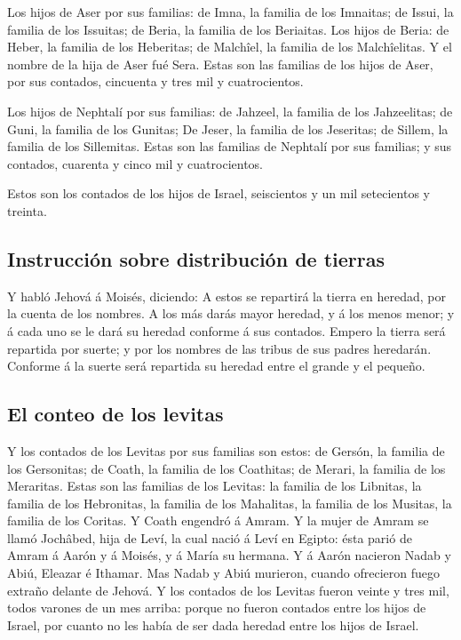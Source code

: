  Los hijos de Aser por sus familias: de Imna, la familia de
los Imnaitas; de Issui, la familia de los Issuitas; de Beria, la familia
de los Beriaitas.  Los hijos de Beria: de Heber, la familia
de los Heberitas; de Malchîel, la familia de los Malchîelitas.
 Y el nombre de la hija de Aser fué Sera. 
Estas son las familias de los hijos de Aser, por sus contados, cincuenta
y tres mil y cuatrocientos.

 Los hijos de Nephtalí por sus familias: de Jahzeel, la
familia de los Jahzeelitas; de Guni, la familia de los Gunitas;
 De Jeser, la familia de los Jeseritas; de Sillem, la
familia de los Sillemitas.  Estas son las familias de
Nephtalí por sus familias; y sus contados, cuarenta y cinco mil y
cuatrocientos.

 Estos son los contados de los hijos de Israel, seiscientos
y un mil setecientos y treinta.

\hypertarget{instrucciuxf3n-sobre-distribuciuxf3n-de-tierras}{%
\subsection{Instrucción sobre distribución de
tierras}\label{instrucciuxf3n-sobre-distribuciuxf3n-de-tierras}}

 Y habló Jehová á Moisés, diciendo:  A estos
se repartirá la tierra en heredad, por la cuenta de los nombres.
 A los más darás mayor heredad, y á los menos menor; y á
cada uno se le dará su heredad conforme á sus contados. 
Empero la tierra será repartida por suerte; y por los nombres de las
tribus de sus padres heredarán.  Conforme á la suerte será
repartida su heredad entre el grande y el pequeño.

\hypertarget{el-conteo-de-los-levitas}{%
\subsection{El conteo de los levitas}\label{el-conteo-de-los-levitas}}

 Y los contados de los Levitas por sus familias son estos:
de Gersón, la familia de los Gersonitas; de Coath, la familia de los
Coathitas; de Merari, la familia de los Meraritas.  Estas
son las familias de los Levitas: la familia de los Libnitas, la familia
de los Hebronitas, la familia de los Mahalitas, la familia de los
Musitas, la familia de los Coritas. Y Coath engendró á Amram.
 Y la mujer de Amram se llamó Jochâbed, hija de Leví, la
cual nació á Leví en Egipto: ésta parió de Amram á Aarón y á Moisés, y á
María su hermana.  Y á Aarón nacieron Nadab y Abiú, Eleazar
é Ithamar.  Mas Nadab y Abiú murieron, cuando ofrecieron
fuego extraño delante de Jehová.  Y los contados de los
Levitas fueron veinte y tres mil, todos varones de un mes arriba: porque
no fueron contados entre los hijos de Israel, por cuanto no les había de
ser dada heredad entre los hijos de Israel.

